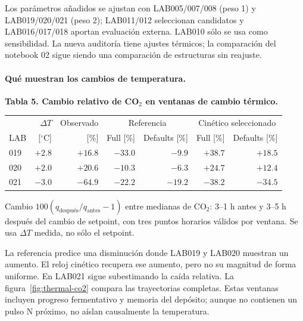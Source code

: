 \documentclass[10pt,a4paper]{article}
\begin{document}
Los parámetros añadidos se ajustan con LAB005/007/008 (peso 1) y
LAB019/020/021 (peso 2); LAB011/012 seleccionan candidatos y LAB016/017/018
aportan evaluación externa. LAB010 sólo se usa como sensibilidad.
La nueva auditoría tiene ajustes térmicos; la comparación del notebook 02
sigue siendo una comparación de estructuras sin reajuste.

\paragraph{Qué muestran los cambios de temperatura.}
\begin{center}\small
\textbf{Tabla 5. Cambio relativo de CO$_2$ en ventanas de cambio térmico.}\par\medskip
\begin{tabular}{@{}lrrrrrr@{}}
\toprule
& $\Delta T$ & Observado & \multicolumn{2}{c}{Referencia} & \multicolumn{2}{c}{Cinético seleccionado}\\
LAB & [$^\circ$C] & [\%] & Full [\%] & Defaults [\%] & Full [\%] & Defaults [\%]\\\midrule
019 & $+2.8$ & $+16.8$ & $-33.0$ & $-9.9$ & $+38.7$ & $+18.5$\\
020 & $+2.0$ & $+20.6$ & $-10.3$ & $-6.3$ & $+24.7$ & $+12.4$\\
021 & $-3.0$ & $-64.9$ & $-22.2$ & $-19.2$ & $-38.2$ & $-34.5$\\
\bottomrule
\end{tabular}\par\smallskip
Cambio $100(q_{\text{después}}/q_{\text{antes}}-1)$ entre medianas de
CO$_2$: 3--1 h antes y 3--5 h después del cambio de setpoint, con tres puntos
horarios válidos por ventana. Se usa $\Delta T$ medida, no sólo el setpoint.
\end{center}
La referencia predice una disminución donde LAB019 y LAB020 muestran un
aumento. El reloj cinético recupera ese aumento, pero no su magnitud de forma
uniforme. En LAB021 sigue subestimando la caída relativa.
La figura~\ref{fig:thermal-co2} compara las trayectorias completas.
Estas ventanas incluyen progreso fermentativo y memoria del depósito;
aunque no contienen un pulso N próximo, no aíslan causalmente la temperatura.
\end{document}
